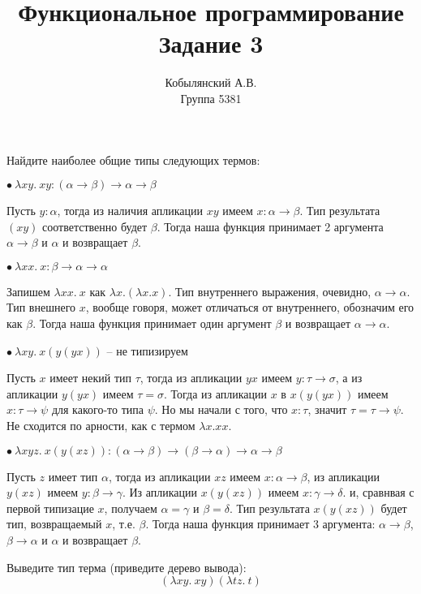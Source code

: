 \documentclass[a4paper,12pt]{article}
\title{Функциональное программирование \\ Задание 3}
\author{ Кобылянский А.В. \\ Группа 5381 }
\date {}
\newcounter{zcounter}
\newcommand{\z}{\par\addtocounter{zcounter}{1}%
\textsc{\fbox{\textbf{FP\arabic{zcounter}}}\quad} }
\begin{document}
\maketitle
\newpage
{}

\z Найдите наиболее общие типы следующих термов:

$ \bullet \: \lambda xy. \:xy : (\alpha \to \beta) \to \alpha \to \beta $

Пусть $y: \alpha$, тогда из наличия апликации $xy$ имеем $x: \alpha \to \beta$. 
Тип результата $(xy)$ соответственно будет $\beta$. 
Тогда наша функция принимает 2 аргумента $\alpha \to \beta$ и $\alpha$ и возвращает $\beta$.

$ \bullet \: \lambda xx. \:x  : \beta \to \alpha \to \alpha $

Запишем $\lambda xx. \:x$ как $\lambda x.(\lambda x.x)$. 
Тип внутреннего выражения, очевидно, $\alpha \to \alpha$. 
Тип внешнего $x$, вообще говоря, может отличаться от внутреннего, обозначим его как $\beta$.
Тогда наша функция принимает один аргумент $\beta$ и возвращает $\alpha \to \alpha$.

$ \bullet \: \lambda xy. \:x(y(yx))$ -- не типизируем

Пусть $x$ имеет некий тип $\tau$, тогда из апликации $yx$ имеем 
$y : \tau \to \sigma$, а из апликации $y(yx)$ имеем $\tau = \sigma$. 
Тогда из апликации $x$ в $x(y(yx))$ имеем $x: \tau \to \psi$ 
для какого-то типа $\psi$. Но мы начали с того, что $x: \tau$, значит
$\tau = \tau \to \psi$. Не сходится по арности, как с термом $\lambda x.xx$.

$ \bullet \: \lambda xyz. \:x(y(xz)) : (\alpha \to \beta) \to (\beta \to \alpha) \to \alpha \to \beta$

Пусть $z$ имеет тип $\alpha$, тогда из апликации $xz$ имеем 
$x : \alpha \to \beta$, из апликации $y(xz)$ имеем $y : \beta \to \gamma$. 
Из апликации $x(y(xz))$ имеем $x : \gamma \to \delta$. и, сравнвая с первой типизацие $x$,
 получаем $\alpha = \gamma$ и $\beta = \delta$. Тип результата $x(y(xz))$ 
будет тип, возвращаемый $x$, т.е. $\beta$.
Тогда наша функция принимает 3 аргумента: $\alpha \to \beta$,
$\beta \to \alpha$ и $\alpha$ и возвращает $\beta$.

\break

\z Выведите тип терма (приведите дерево вывода):
\[
(\lambda xy . \:x y)(\lambda tz.\:t)
\]

\begin{prooftree*}
\end{prooftree*}
\end{document}
